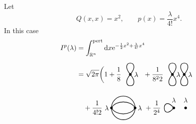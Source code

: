 \begin{example}
  Let
  \begin{equation*}
    Q(x, x) = x^2, \qquad p(x) = \frac{\lambda}{4!} x^4.
  \end{equation*}
  In this case
  \begin{align*}
    I^p (\lambda)
    &= \int_{\Rbb^n}^\text{pert} \drm x \euler^{-\frac{1}{2} x^2 + \frac{\lambda}{4!} x^4} \\
    &= \sqrt{2 \pi} \biggl(
      1 + \frac{1}{8} \hspace{-2mm}
      \begin{tikzpicture}[scale=2, baseline=-1mm]
        \draw[fill=black] (0, 0) circle (.3mm);
        \node at (.15, 0) {$\lambda$};
        \draw[thick] (0, 0) to[out=50, in=130, loop] (0, 0);
        \draw[thick] (0, 0) to[out=230, in=-50, loop] (0, 0);
      \end{tikzpicture}
      + \frac{1}{8^2 2} \hspace{-2mm}
      \begin{tikzpicture}[scale=2, baseline=-1mm]
        \draw[fill=black] (0, 0) circle (.3mm);
        \node at (.15, 0) {$\lambda$};
        \draw[fill=black] (.3, 0) circle (.3mm);
        \node at (.45, 0) {$\lambda$};
        \draw[thick] (0, 0) to[out=50, in=130, loop] (0, 0);
        \draw[thick] (0, 0) to[out=230, in=-50, loop] (0, 0);
        \draw[thick] (.3, 0) to[out=50, in=130, loop] (.3, 0);
        \draw[thick] (.3, 0) to[out=230, in=-50, loop] (.3, 0);
      \end{tikzpicture}\\
    &\quad + \frac{1}{4! 2}
      \begin{tikzpicture}[scale=2, baseline=-1mm]
        \draw[fill=black] (0, 0) circle (.3mm);
        \node at (-.12, 0) {$\lambda$};
        \draw[fill=black] (.6, 0) circle (.3mm);
        \node at (.72, 0) {$\lambda$};
        \draw[thick] (.3, 0) circle (3mm);
        \draw[thick] (0, 0) to[out=60, in=120] (.6, 0);
        \draw[thick] (0, 0) to[out=-60, in=-120] (.6, 0);
      \end{tikzpicture}
    + \frac{1}{2^4} 
      \begin{tikzpicture}[scale=2, baseline=-1mm]
        \draw[fill=black] (0, 0) circle (.3mm);
        \draw[fill=black] (.3, 0) circle (.3mm);
        \node at (0, .2) {$\lambda$};
        \node at (.3, .2) {$\lambda$};
        \draw[thick] (0, 0) to[out=-130, in=130, loop] (0, 0);

\end{tikzpicture}
\end{align*}
\end{example}
